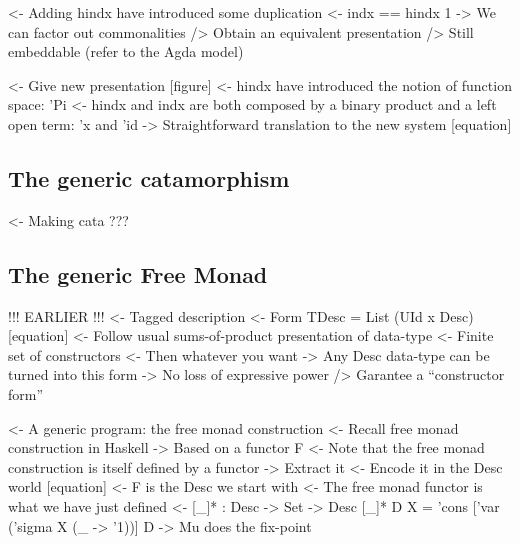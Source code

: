 \documentclass{article}
\newenvironment{structure}{\footnotesize\verbatim}{\endverbatim}
\begin{document}
\begin{structure}
<- Adding hindx have introduced some duplication
    <- indx == hindx 1
    -> We can factor out commonalities 
        /> Obtain an equivalent presentation
        /> Still embeddable (refer to the Agda model)
\end{structure}

\begin{structure}
<- Give new presentation [figure]
    <- hindx have introduced the notion of function space: 'Pi
    <- hindx and indx are both composed by a binary product and a left open term: 'x and 'id 
    -> Straightforward translation to the new system [equation]
\end{structure}

\subsection{The generic catamorphism}

\begin{structure}
<- Making cata
    ???
\end{structure}

\subsection{The generic Free Monad}

\begin{structure}
!!! EARLIER !!!
<- Tagged description
    <- Form TDesc = List (UId x Desc) [equation]
    <- Follow usual sums-of-product presentation of data-type
        <- Finite set of constructors
        <- Then whatever you want
    -> Any Desc data-type can be turned into this form
        -> No loss of expressive power
        /> Garantee a ``constructor form''
\end{structure}

\begin{structure}
<- A generic program: the free monad construction
    <- Recall free monad construction in Haskell
        -> Based on a functor F
    <- Note that the free monad construction is itself defined by a functor
        -> Extract it
    <- Encode it in the Desc world [equation]
        <- F is the Desc we start with
        <- The free monad functor is what we have just defined
        <- [\_]* : Desc -> Set -> Desc
           [\_]* D X = 'cons ['var ('sigma X (\_ -> '1))] D
        -> Mu does the fix-point
\end{structure}
\end{document}
